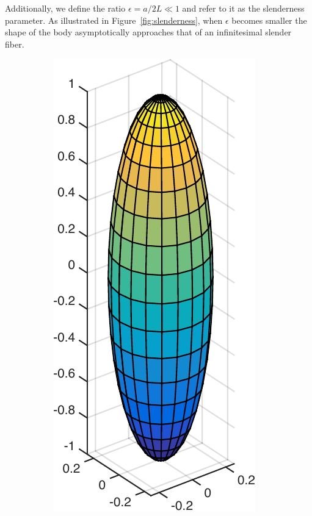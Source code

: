 \documentclass[a4paper,11pt]{kth-mag}
\begin{document}
Additionally, we define the ratio $\epsilon = a / 2 L \ll 1$ and refer to it as the slenderness parameter. As illustrated in Figure~\ref{fig:slenderness}, when $\epsilon$ becomes smaller the shape of the body asymptotically approaches that of an infinitesimal slender fiber.

\begin{figure}[!htbp]
  \centering
  \begin{subfigure}[h]{0.24\textwidth}
    \centering
    \includegraphics[width=\textwidth]{img/slender/1_4.pdf}

\end{subfigure}
\end{figure}
\end{document}
